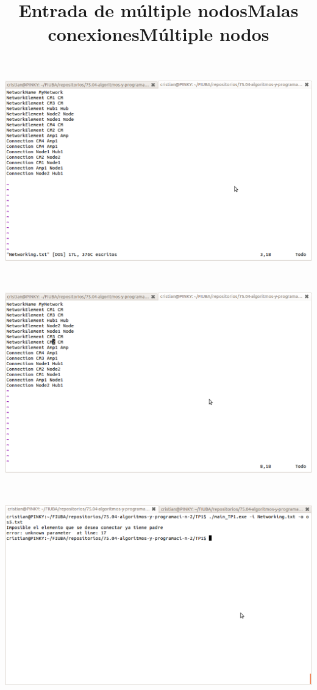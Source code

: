 \documentclass[10pt,a4paper]{article}
\begin{document}
\begin{center}
\includegraphics[scale=0.25]{Images/entrada de malas conexiones.png}\\
\end{center}\title{Entrada de múltiple nodos}\\
\begin{center}
\includegraphics[scale=0.25]{Images/entrada de multiple nodos.png}\\
\end{center}\title{Malas conexiones}\\
\begin{center}
\includegraphics[scale=0.25]{Images/malas conexiones.png}\\
\end{center}\title{Múltiple nodos}\\
\end{document}
